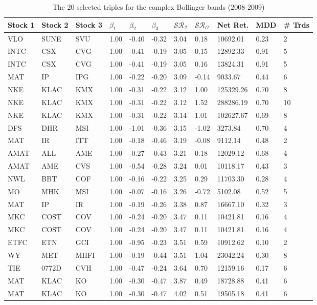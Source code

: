 \documentclass[11pt,a4,twosided,singlespacing,titlepagenumber=on]{scrreprt}
\numberwithin{equation}{chapter} %
\theoremstyle{remark}
\begin{document}
\begin{table}[H]
\centering
\begin{tabular}{lllllllllll}
\hline
Stock 1 & Stock 2 & Stock 3 & $\beta_1$ & $\beta_2$ & $\beta_3$ & $\mathcal{SR}_\mathcal{I}$ & $\mathcal{SR}_\mathcal{O}$ & Net Ret. & MDD & \# Trds\\ \hline
VLO  & SUNE  & SVU  & 1.00 & -0.40 & -0.32 & 3.04 & 0.18 & 10692.01 & 0.23 & 2 \\
INTC  & CSX  & CVG  & 1.00 & -0.41 & -0.19 & 3.05 & 0.15 & 12892.33 & 0.91 & 5 \\
INTC  & CSX  & CVG  & 1.00 & -0.41 & -0.19 & 3.05 & 0.16 & 13824.31 & 0.91 & 5 \\
MAT  & IP  & IPG  & 1.00 & -0.22 & -0.20 & 3.09 & -0.14 & 9033.67 & 0.44 & 6 \\
NKE  & KLAC  & KMX  & 1.00 & -0.31 & -0.22 & 3.12 & 1.00 & 125329.26 & 0.70 & 8 \\
NKE  & KLAC  & KMX  & 1.00 & -0.31 & -0.22 & 3.12 & 1.52 & 288286.19 & 0.70 & 10 \\
NKE  & KLAC  & KMX  & 1.00 & -0.31 & -0.22 & 3.14 & 1.01 & 102627.67 & 0.69 & 8 \\
DFS  & DHR  & MSI  & 1.00 & -1.01 & -0.36 & 3.15 & -1.02 & 3273.84 & 0.70 & 4 \\
MAT  & IR  & ITT  & 1.00 & -0.18 & -0.46 & 3.19 & -0.08 & 9112.14 & 0.48 & 2 \\
AMAT  & ALL  & AME  & 1.00 & -0.27 & -0.43 & 3.21 & 0.18 & 12029.12 & 0.68 & 4 \\
AMAT  & AME  & CVS  & 1.00 & -0.54 & -0.28 & 3.24 & 0.01 & 10118.17 & 0.43 & 3 \\
NWL  & BBT  & COF  & 1.00 & -0.16 & -0.22 & 3.25 & 0.29 & 11703.30 & 0.28 & 4 \\
MO  & MHK  & MSI  & 1.00 & -0.07 & -0.16 & 3.26 & -0.72 & 5102.08 & 0.52 & 5 \\
MAT  & IP  & IR  & 1.00 & -0.19 & -0.26 & 3.38 & 0.87 & 16667.10 & 0.32 & 3 \\
MKC  & COST  & COV  & 1.00 & -0.24 & -0.20 & 3.47 & 0.11 & 10421.81 & 0.16 & 4 \\
MKC  & COST  & COV  & 1.00 & -0.24 & -0.20 & 3.47 & 0.11 & 10421.81 & 0.16 & 4 \\
ETFC  & ETN  & GCI  & 1.00 & -0.95 & -0.23 & 3.51 & 0.59 & 10912.62 & 0.10 & 2 \\
WY  & MET  & MHFI  & 1.00 & -0.19 & -0.44 & 3.51 & 1.04 & 23042.24 & 0.30 & 8 \\
TIE  & 0772D & CVH  & 1.00 & -0.47 & -0.24 & 3.64 & 0.70 & 12159.16 & 0.17 & 6 \\
MAT  & KLAC  & KO  & 1.00 & -0.30 & -0.47 & 3.87 & 0.49 & 18728.88 & 0.41 & 6 \\
MAT  & KLAC  & KO  & 1.00 & -0.30 & -0.47 & 4.02 & 0.51 & 19505.18 & 0.41 & 6 \\
\hline
\end{tabular}
\caption{The 20 selected triples for the complex Bollinger bands (2008-2009)}
\label{20_selected_triples_simple_bands_sv}
\end{table}
\end{document}
